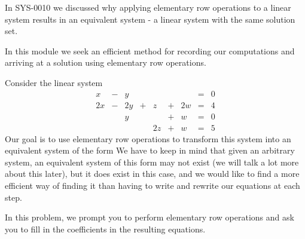 \documentclass{ximera}
\begin{document}
In SYS-0010 we discussed why applying elementary row operations to a linear system results in an equivalent system - a linear system with the same solution set.

In this module we seek an efficient method for recording our computations and arriving at a solution using elementary row operations. 

\begin{exploration}\label{init:augmentedmatrixex}
Consider the linear system
\begin{equation}\label{eq:sys20originalsystem1}
\begin{array}{ccccccccc}
      x &- &y&&&&&= &0 \\
	 2x& -&2y&+&z&+&2w&=&4\\
     & &y&&&+&w&=&0\\
     & &&&2z&+&w&=&5
    \end{array}
\end{equation}
Our goal is to use elementary row operations to transform this system into an equivalent system of the form
 We have to keep in mind that given an arbitrary system, an equivalent system of this form may not exist (we will talk a lot more about this later), but it does exist in this case, and we would like to find a more efficient way of finding it than having to write and rewrite our equations at each step.   
 
In this problem, we prompt you to perform elementary row operations and ask you to fill in the coefficients in the resulting equations.
 
    

\end{exploration}
\end{document}
